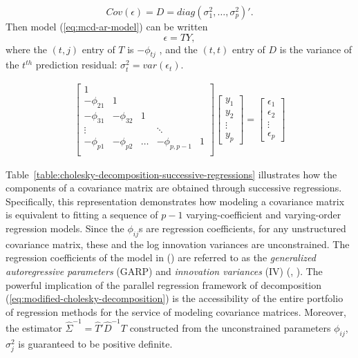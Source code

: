 \[
Cov\left(\epsilon\right) = D = diag\left(\sigma_1^2,\dots, \sigma_p^2\right)'.
\]
\noindent
Then model (\ref{eq:mcd-ar-model}) can be written 
\begin{equation} \label{eq:e-equals-T-Y}
\epsilon = TY,
\end{equation}
\noindent
where the $\left(t, j\right)$ entry of $T$ is $-\phi_{tj}$ , and the $(t, t)$ entry of $D$ is the variance of the $t^{th}$ prediction residual: $\sigma_t^2 = var\left(\epsilon_t\right)$. 

\begin{align}
\begin{bmatrix}
1&&&&\\
-\phi_{21}&1&&&\\
-\phi_{31}&-\phi_{32}&1&&\\
\vdots &&&\ddots& \\
-\phi_{p1}&-\phi_{p2}& \dots & -\phi_{p,p-1}&1\\
\end{bmatrix}
\begin{bmatrix}
y_1 \\
y_2 \\ \vdots \\ y_p
\end{bmatrix} = \begin{bmatrix}
\epsilon_1 \\
\epsilon_2 \\ \vdots \\ \epsilon_p
\end{bmatrix}
\end{align}


Table~\ref{table:cholesky-decomposition-successive-regressions} illustrates how the components of a covariance matrix are obtained through successive regressions. Specifically, this representation demonstrates how modeling a covariance matrix is equivalent to fitting a sequence of $p - 1$ varying-coefficient and varying-order regression models. Since the $\phi_{ij}$s are regression coefficients, for any unstructured covariance matrix, these and the log innovation variances are unconstrained. The regression coefficients of the model in (\label{eq:mcd-ar-model}) are referred to as the \textit{generalized autoregressive parameters} (GARP) and \textit{innovation variances} (IV) (\cite{pourahmadi1999joint}, \cite{pourahmadi2000maximum}). The powerful implication of the parallel regression framework of decomposition (\ref{eq:modified-cholesky-decomposition}) is the accessibility of the entire portfolio of regression methods for the service of modeling covariance matrices. Moreover, the estimator $\hat{\Sigma}^{-1} = \hat{T}' \hat{D}^{-1} {T}$ constructed from the unconstrained parameters $\phi_{ij}$, $\sigma_j^2$ is guaranteed to be positive definite. 
\bigskip

